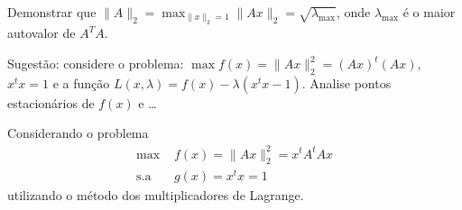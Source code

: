 \begin{questions}

     Demonstrar que $\| A \|_2 = \max_{\| x \|_2 = 1} \| A x \|_2 = \sqrt{\lambda_\text{max}}$, onde $\lambda_\text{max}$ \'{e} o maior autovalor de $A^T A$.
    
    Sugest\~{a}o: considere o problema: $\max f(x) = \| A x \|_2^2 = \left( A x \right)^t \left( A x \right)$, $x^t x = 1$ e a fun\c{c}\~{a}o $L(x, \lambda) = f(x) - \lambda \left( x^t x - 1 \right)$. Analise pontos estacion\'{a}rios de $f(x)$ e \dots
    \begin{solution}
        Considerando o problema
        \begin{align*}
            \text{max } & f(x) = \| A x \|_2^2 = x^t A^t A x \\
            \text{s.a } & g(x) = x^t x = 1
        \end{align*}
        utilizando o m\'{e}todo dos multiplicadores de Lagrange.


\end{solution}
\end{questions}

